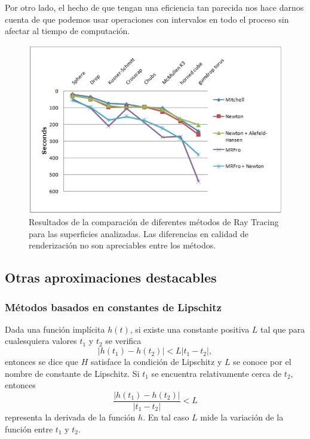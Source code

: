 Por otro lado, el hecho de que tengan una eficiencia tan parecida nos hace darnos cuenta de que podemos usar operaciones con intervalos en todo el proceso sin afectar al tiempo de computación.

\begin{figure}[h]
	\centering
	\includegraphics[scale=0.5]{images/florez8.png}
	\caption{Resultados de la comparación de diferentes métodos de Ray Tracing para las superficies analizadas. Las diferencias en calidad de renderización no son apreciables entre los métodos.}
	\label{florez410}
\end{figure}

\subsection{Otras aproximaciones destacables}

\subsubsection{Métodos basados en constantes de Lipschitz}

Dada una función implícita $h(t)$, si existe una constante positiva $L$ tal que para cualesquiera valores $t_1$ y $t_2$ se verifica
\begin{equation}
|h(t_1) - h(t_2)| < L |t_1 - t_2|,
\nonumber
\end{equation}
entonces se dice que $H$ satisface la condición de Lipschitz y $L$ se conoce por el nombre de constante de Lipschitz. Si $t_1$ se encuentra relativamente cerca de $t_2$, entonces
\begin{equation}
\frac{|h(t_1) - h(t_2)|}{|t_1 - t_2|} < L
\nonumber
\end{equation}
representa la derivada de la función $h$. En tal caso $L$ mide la variación de la función entre $t_1$ y $t_2$.


